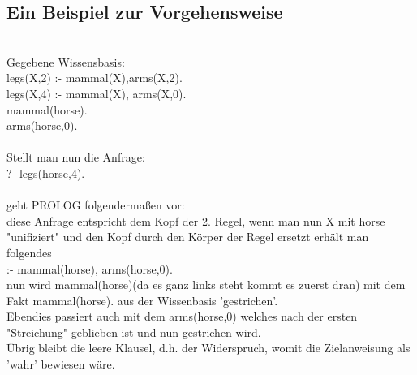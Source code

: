 \subsection{Ein Beispiel zur Vorgehensweise}\qquad\\
Gegebene Wissensbasis:\\
legs(X,2) :- mammal(X),arms(X,2).\\
legs(X,4) :- mammal(X), arms(X,0).\\
mammal(horse).\\
arms(horse,0).\\
\qquad\\
Stellt man nun die Anfrage:\\
?- legs(horse,4).\\
\qquad\\
geht PROLOG folgendermaßen vor:\\
diese Anfrage entspricht dem Kopf der 2. Regel, wenn man  nun X mit horse "unifiziert" und den Kopf durch den Körper der Regel ersetzt erhält man folgendes\\
:- mammal(horse), arms(horse,0).\\
nun wird mammal(horse)(da es ganz links steht kommt es zuerst dran) mit dem Fakt mammal(horse). aus der Wissenbasis 'gestrichen'.\\
Ebendies passiert auch mit dem arms(horse,0) welches nach der ersten "Streichung" geblieben ist und nun gestrichen wird.\\
Übrig bleibt die leere Klausel, d.h. der Widerspruch, womit die Zielanweisung als 'wahr' bewiesen wäre. 
